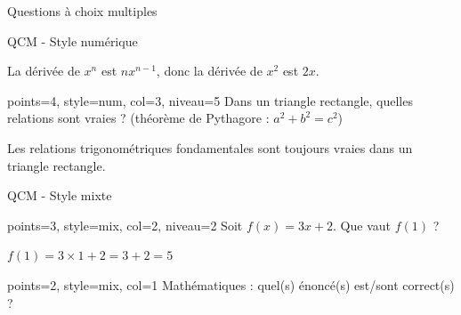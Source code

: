 \documentclass[theme=vert]{nfdevoirs}
\begin{document}
\begin{devoir}
\begin{partie}{Questions à choix multiples}
\begin{exercice}{QCM - Style numérique}
            \begin{correction}
                La dérivée de $x^n$ est $nx^{n-1}$, donc la dérivée de $x^2$ est $2x$.
            \end{correction}

            \begin{qcm}{points=4, style=num, col=3, niveau=5}
                Dans un triangle rectangle, quelles relations sont vraies ? (théorème de Pythagore : $a^2 + b^2 = c^2$)
                \begin{choix}
                    \proposition*{$\tan(\theta) = \frac{\sin(\theta)}{\cos(\theta)}$}
                \end{choix}
            \end{qcm}

            \begin{correction}
                Les relations trigonométriques fondamentales sont toujours vraies dans un triangle rectangle.
            \end{correction}

        \end{exercice}

        \begin{exercice}{QCM - Style mixte}

            \begin{qcm}{points=3, style=mix, col=2, niveau=2}
                Soit $f(x) = 3x + 2$. Que vaut $f(1)$ ?
                \begin{choix}
                \end{choix}
            \end{qcm}

            \begin{correction}
                $f(1) = 3 \times 1 + 2 = 3 + 2 = 5$
            \end{correction}

            \begin{qcm}{points=2, style=mix, col=1}
                Mathématiques : quel(s) énoncé(s) est/sont correct(s) ?


\end{qcm}
\end{exercice}
\end{partie}
\end{devoir}
\end{document}
